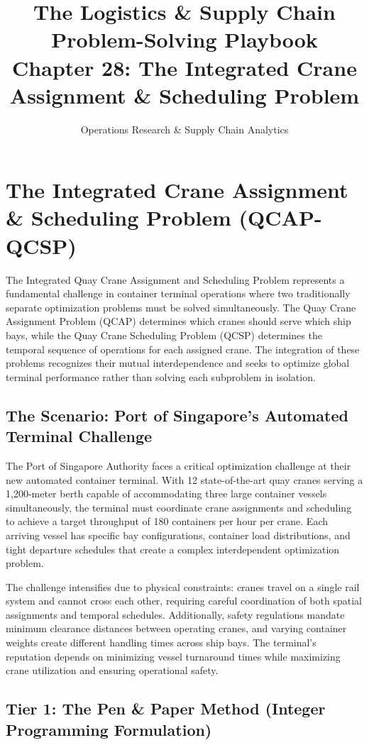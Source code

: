 \documentclass{article}
\title{The Logistics \& Supply Chain Problem-Solving Playbook\\Chapter 28: The Integrated Crane Assignment \& Scheduling Problem}
\author{Operations Research \& Supply Chain Analytics}
\date{}
\begin{document}
\maketitle

\section{The Integrated Crane Assignment \& Scheduling Problem (QCAP-QCSP)}

The Integrated Quay Crane Assignment and Scheduling Problem represents a fundamental challenge in container terminal operations where two traditionally separate optimization problems must be solved simultaneously. The Quay Crane Assignment Problem (QCAP) determines which cranes should serve which ship bays, while the Quay Crane Scheduling Problem (QCSP) determines the temporal sequence of operations for each assigned crane. The integration of these problems recognizes their mutual interdependence and seeks to optimize global terminal performance rather than solving each subproblem in isolation.

\subsection{The Scenario: Port of Singapore's Automated Terminal Challenge}

The Port of Singapore Authority faces a critical optimization challenge at their new automated container terminal. With 12 state-of-the-art quay cranes serving a 1,200-meter berth capable of accommodating three large container vessels simultaneously, the terminal must coordinate crane assignments and scheduling to achieve a target throughput of 180 containers per hour per crane. Each arriving vessel has specific bay configurations, container load distributions, and tight departure schedules that create a complex interdependent optimization problem.

The challenge intensifies due to physical constraints: cranes travel on a single rail system and cannot cross each other, requiring careful coordination of both spatial assignments and temporal schedules. Additionally, safety regulations mandate minimum clearance distances between operating cranes, and varying container weights create different handling times across ship bays. The terminal's reputation depends on minimizing vessel turnaround times while maximizing crane utilization and ensuring operational safety.

\subsection{Tier 1: The Pen \& Paper Method (Integer Programming Formulation)}
\end{document}
